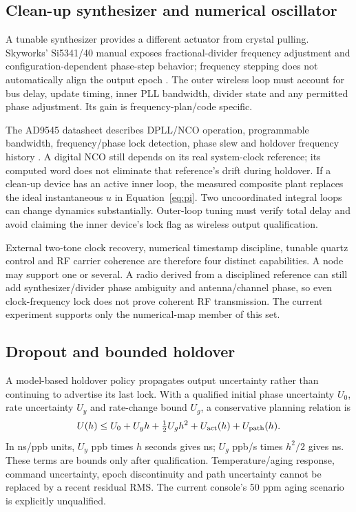 \documentclass[11pt,letterpaper]{article}
\begin{document}
\subsection{Clean-up synthesizer and numerical oscillator}
A tunable synthesizer provides a different actuator from crystal pulling. Skyworks' Si5341/40 manual exposes fractional-divider frequency adjustment and configuration-dependent phase-step behavior; frequency stepping does not automatically align the output epoch \cite{si5341}. The outer wireless loop must account for bus delay, update timing, inner PLL bandwidth, divider state and any permitted phase adjustment. Its gain is frequency-plan/code specific.

The AD9545 datasheet describes DPLL/NCO operation, programmable bandwidth, frequency/phase lock detection, phase slew and holdover frequency history \cite{ad9545}. A digital NCO still depends on its real system-clock reference; its computed word does not eliminate that reference's drift during holdover. If a clean-up device has an active inner loop, the measured composite plant replaces the ideal instantaneous $u$ in Equation~\ref{eq:pi}. Two uncoordinated integral loops can change dynamics substantially. Outer-loop tuning must verify total delay and avoid claiming the inner device's lock flag as wireless output qualification.

External two-tone clock recovery, numerical timestamp discipline, tunable quartz control and RF carrier coherence are therefore four distinct capabilities. A node may support one or several. A radio derived from a disciplined reference can still add synthesizer/divider phase ambiguity and antenna/channel phase, so even clock-frequency lock does not prove coherent RF transmission. The current experiment supports only the numerical-map member of this set.

\subsection{Dropout and bounded holdover}
A model-based holdover policy propagates output uncertainty rather than continuing to advertise its last lock. With a qualified initial phase uncertainty $U_0$, rate uncertainty $U_y$ and rate-change bound $U_g$, a conservative planning relation is
\begin{equation}
 U(h)\le U_0+U_yh+\tfrac12U_gh^2+U_{\rm act}(h)+U_{\rm path}(h).\label{eq:holdover}
\end{equation}
In ns/ppb units, $U_y$ ppb times $h$ seconds gives ns; $U_g$ ppb/s times $h^2/2$ gives ns. These terms are bounds only after qualification. Temperature/aging response, command uncertainty, epoch discontinuity and path uncertainty cannot be replaced by a recent residual RMS. The current console's 50 ppm aging scenario is explicitly unqualified.
\end{document}
